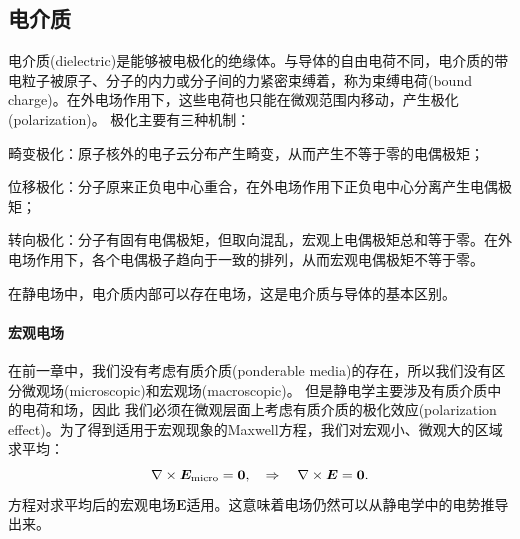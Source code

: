 \subsection{电介质}
电介质(dielectric)是能够被电极化的绝缘体。与导体的自由电荷不同，电介质的带电粒子被原子、分子的内力或分子间的力紧密束缚着，称为束缚电荷(bound charge)。在外电场作用下，这些电荷也只能在微观范围内移动，产生极化(polarization)。
极化主要有三种机制：
\begin{compactenum}
    \item 畸变极化：原子核外的电子云分布产生畸变，从而产生不等于零的电偶极矩；
    \item 位移极化：分子原来正负电中心重合，在外电场作用下正负电中心分离产生电偶极矩；
    \item 转向极化：分子有固有电偶极矩，但取向混乱，宏观上电偶极矩总和等于零。在外电场作用下，各个电偶极子趋向于一致的排列，从而宏观电偶极矩不等于零。
\end{compactenum}
在静电场中，电介质内部可以存在电场，这是电介质与导体的基本区别。
\paragraph{宏观电场}
在前一章中，我们没有考虑有质介质(ponderable media)的存在，所以我们没有区分微观场(microscopic)和宏观场(macroscopic)。
但是静电学主要涉及有质介质中的电荷和场，因此%
我们必须在微观层面上考虑有质介质的极化效应(polarization effect)。为了得到适用于宏观现象的Maxwell方程，我们对宏观小、微观大的区域求平均：%
\begin{equation}
    \label{eqn:curlE-macro}
    \nabla\times\bm E_\text{micro}=\bm 0,\quad\Rightarrow\quad\nabla\times\bm E=\bm 0.
\end{equation}
方程对求平均后的宏观电场$\bm E$适用。这意味着电场仍然可以从静电学中的电势推导出来。

